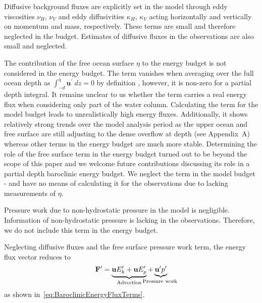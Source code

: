 \documentclass{ametsocV6.1}
\begin{document}
Diffusive background fluxes are explicitly set in the model through eddy viscosities $\nu_H$, $\nu_V$ and eddy diffusivities $\kappa_H$, $\kappa_V$ acting horizontally and vertically on momentum and mass, respectively.
These terms are small and therefore neglected in the budget.
Estimates of diffusive fluxes in the observations are also small and neglected.

The contribution of the free ocean surface $\eta$ to the energy budget is not considered in the energy budget.
The term vanishes when averaging over the full ocean depth as $\int_{-d}^\eta \mathbf{u^\prime}\ dz = 0$ by definition \cite[e.g.][]{kang10}, however, it is non-zero for a partial depth integral.
It remains unclear to us whether the term carries a real energy flux when considering only part of the water column.
Calculating the term for the model budget leads to unrealistically high energy fluxes.
Additionally, it shows relatively strong trends over the model analysis period as the upper ocean and free surface are still adjusting to the dense overflow at depth (see Appendix~A) whereas other terms in the energy budget are much more stable.
Determining the role of the free surface term in the energy budget turned out to be beyond the scope of this paper and we welcome future contributions discussing its role in a partial depth baroclinic energy budget.
We neglect the term in the model budget - and have no means of calculating it for the observations due to lacking measurements of $\eta$.

Pressure work due to non-hydrostatic pressure in the model is negligible.
Information of non-hydrostatic pressure is lacking in the observations.
Therefore, we do not include this term in the energy budget.

Neglecting diffusive fluxes and the free surface pressure work term, the energy flux vector reduces to
\begin{equation}
\mathbf{F'} = \underbrace{\mathbf{u}E'_k + \mathbf{u}E'_p}_\text{Advection} + \underbrace{\mathbf{u^\prime}p^\prime}_{\text{\makebox[0pt]{Pressure work} }}
\label{eq:BaroclinicEnergyFluxTermsAppendix}
\end{equation}
as shown in~\eqref{eq:BaroclinicEnergyFluxTerms}.




\end{document}
